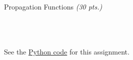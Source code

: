 \begin{hwkProblem}{1}{Propagation Functions \textit{(30 pts.)}}
	\inputminted[firstline=156, lastline=169]{python}{./src/hw03.py}

	\hwkPart{} \label{hwk:s01c}

	\inputminted[firstline=172, lastline=191]{python}{./src/hw03.py}

	\hwkPart{} \label{hwk:s01d}

	\inputminted[firstline=194, lastline=221]{python}{./src/hw03.py}

	\hwkPart{} \label{hwk:s01e}

	\inputminted{python}{./outputs/text/s01e.txt}

	\hwkCode{} \label{code:s01}

	See the \href{https://www.github.com/vaisriv/enae441-hw03/blob/main/src/hw03.py#L118}{Python code} for this assignment.

\end{hwkProblem}

